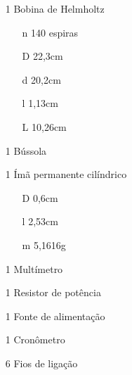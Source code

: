 \begin{itemize}
    \item [1] Bobina de Helmholtz 
        \begin{itemize}
             \item [n] 140 espiras
             \item [D] 22,3cm
             \item [d] 20,2cm
             \item [l] 1,13cm
             \item [L] 10,26cm
        \end{itemize}
    \item [1] Bússola
    \item [1] Ímã permanente cilíndrico 
        \begin{itemize}
             \item [D] 0,6cm
             \item [l] 2,53cm
             \item [m] 5,1616g
        \end{itemize}
    \item [1] Multímetro
    \item [1] Resistor de potência
    \item [1] Fonte de alimentação
    \item [1] Cronômetro
    \item [6] Fios de ligação
\end{itemize}